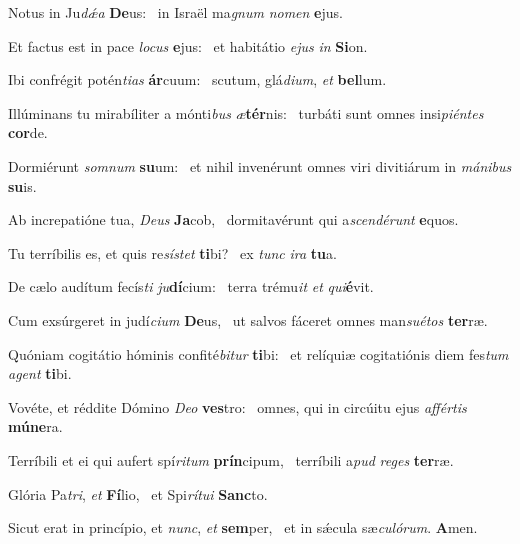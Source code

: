 \item Notus in Ju\textit{dǽa} \textbf{De}us:~\psstar{} in Israël ma\textit{gnum} \textit{nomen} \textbf{e}jus.
\item Et factus est in pace \textit{locus} \textbf{e}jus:~\psstar{} et habitátio \textit{ejus} \textit{in} \textbf{Si}on.
\item Ibi confrégit potén\textit{tias} \textbf{ár}cuum:~\psstar{} scutum, glá\textit{dium}, \textit{et} \textbf{bel}lum.
\item Illúminans tu mirabíliter a mónti\textit{bus} \textit{æ}\textbf{tér}nis:~\psstar{} turbáti sunt omnes insi\textit{piéntes} \textbf{cor}de.
\item Dormiérunt \textit{somnum} \textbf{su}um:~\psstar{} et nihil invenérunt omnes viri divitiárum in \textit{mánibus} \textbf{su}is.
\item Ab increpatióne tua, \textit{Deus} \textbf{Ja}cob,~\psstar{} dormitavérunt qui a\-\textit{scendérunt} \textbf{e}quos.
\item Tu terríbilis es, et quis re\textit{sístet} \textbf{ti}bi?~\psstar{} ex \textit{tunc} \textit{ira} \textbf{tu}a.
\item De cælo audítum fecís\textit{ti} \textit{ju}\textbf{dí}cium:~\psstar{} terra trému\textit{it} \textit{et} \textit{qui}\textbf{é}vit.
\item Cum exsúrgeret in judí\textit{cium} \textbf{De}us,~\psstar{} ut salvos fáceret omnes man\textit{suétos} \textbf{ter}ræ.
\item Quóniam cogitátio hóminis confité\textit{bitur} \textbf{ti}bi:~\psstar{} et relíquiæ cogitatiónis diem fes\textit{tum} \textit{agent} \textbf{ti}bi.
\item Vovéte, et réddite Dómino \textit{Deo} \textbf{ves}tro:~\psstar{} omnes, qui in circúitu ejus \textit{affértis} \textbf{mú}\textbf{ne}ra.
\item Terríbili et ei qui aufert spí\textit{ritum} \textbf{prín}cipum,~\psstar{} terríbili a\textit{pud} \textit{reges} \textbf{ter}ræ.
\item Glória Pa\textit{tri}, \textit{et} \textbf{Fí}lio,~\psstar{} et Spi\textit{rítui} \textbf{Sanc}to.
\item Sicut erat in princípio, et \textit{nunc}, \textit{et} \textbf{sem}per,~\psstar{} et in sǽcula sæ\textit{culórum}. \textbf{A}men.
